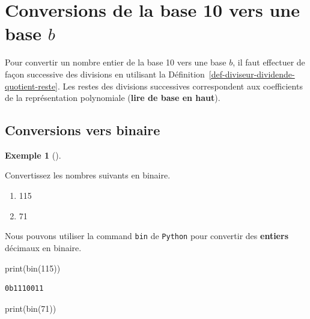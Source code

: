 \documentclass[
  letterpaper,
]{scrbook}
\newenvironment{Shaded}{}{}
\newcommand{\BuiltInTok}[1]{#1}
\newcommand{\DecValTok}[1]{\textcolor[rgb]{0.25,0.63,0.44}{#1}}
\newcommand{\NormalTok}[1]{#1}
\providecommand{\tightlist}{%
  \setlength{\itemsep}{0pt}\setlength{\parskip}{0pt}}\usepackage{longtable,booktabs,array}
\theoremstyle{plain}
\theoremstyle{definition}
\newtheorem{example}{Exemple}[chapter]
\theoremstyle{definition}
\theoremstyle{remark}
\begin{document}
\hypertarget{conversions-de-la-base-10-vers-une-base-b}{%
\section{\texorpdfstring{Conversions de la base 10 vers une base
\(b\)}{Conversions de la base 10 vers une base b}}\label{conversions-de-la-base-10-vers-une-base-b}}

Pour convertir un nombre entier de la base 10 vers une base \(b\), il
faut effectuer de façon successive des divisions en utilisant la
Définition~\ref{def-diviseur-dividende-quotient-reste}. Les restes des
divisions successives correspondent aux coefficients de la
représentation polynomiale (\textbf{lire de base en haut}).

\hypertarget{conversions-vers-binaire}{%
\subsection{Conversions vers binaire}\label{conversions-vers-binaire}}

\leavevmode{}%
\begin{example}[]\label{exm-conversion-vers-binaire}

Convertissez les nombres suivants en binaire.

\begin{enumerate}
\def\labelenumi{\alph{enumi})}
\tightlist
\item
  115
\item
  71
\end{enumerate}

\end{example}

Nous pouvons utiliser la command \texttt{bin} de \texttt{Python} pour
convertir des \textbf{entiers} décimaux en binaire.

\begin{Shaded}
\begin{Highlighting}[]
\BuiltInTok{print}\NormalTok{(}\BuiltInTok{bin}\NormalTok{(}\DecValTok{115}\NormalTok{))}
\end{Highlighting}
\end{Shaded}

\begin{verbatim}
0b1110011
\end{verbatim}

\begin{Shaded}
\begin{Highlighting}[]
\BuiltInTok{print}\NormalTok{(}\BuiltInTok{bin}\NormalTok{(}\DecValTok{71}\NormalTok{))}
\end{Highlighting}
\end{Shaded}
\end{document}
